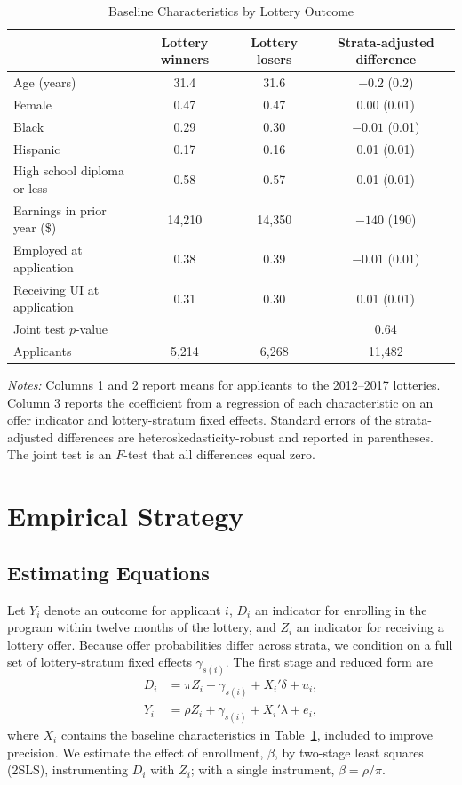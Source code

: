 \documentclass[12pt]{article}
\begin{document}
\begin{table}[htbp]
\centering
\small
\caption{Baseline Characteristics by Lottery Outcome}
\label{tab:balance}
\begin{tabular}{lccc}
\toprule
 & Lottery winners & Lottery losers & Strata-adjusted difference \\
\midrule
Age (years) & 31.4 & 31.6 & $-0.2$ (0.2) \\
Female & 0.47 & 0.47 & 0.00 (0.01) \\
Black & 0.29 & 0.30 & $-0.01$ (0.01) \\
Hispanic & 0.17 & 0.16 & 0.01 (0.01) \\
High school diploma or less & 0.58 & 0.57 & 0.01 (0.01) \\
Earnings in prior year (\$) & 14,210 & 14,350 & $-140$ (190) \\
Employed at application & 0.38 & 0.39 & $-0.01$ (0.01) \\
Receiving UI at application & 0.31 & 0.30 & 0.01 (0.01) \\
\midrule
Joint test $p$-value & & & 0.64 \\
Applicants & 5,214 & 6,268 & 11,482 \\
\bottomrule
\end{tabular}
\par\medskip
\begin{minipage}{0.92\linewidth}
\footnotesize \textit{Notes:} Columns 1 and 2 report means for applicants to the 2012--2017 lotteries. Column 3 reports the coefficient from a regression of each characteristic on an offer indicator and lottery-stratum fixed effects. Standard errors of the strata-adjusted differences are heteroskedasticity-robust and reported in parentheses. The joint test is an $F$-test that all differences equal zero.
\end{minipage}
\end{table}

\section{Empirical Strategy}\label{sec:strategy}

\subsection{Estimating Equations}

Let $Y_i$ denote an outcome for applicant $i$, $D_i$ an indicator for enrolling in the program within twelve months of the lottery, and $Z_i$ an indicator for receiving a lottery offer. Because offer probabilities differ across strata, we condition on a full set of lottery-stratum fixed effects $\gamma_{s(i)}$. The first stage and reduced form are
\begin{align}
D_i &= \pi Z_i + \gamma_{s(i)} + X_i'\delta + u_i, \\
Y_i &= \rho Z_i + \gamma_{s(i)} + X_i'\lambda + e_i,
\end{align}
where $X_i$ contains the baseline characteristics in Table~\ref{tab:balance}, included to improve precision. We estimate the effect of enrollment, $\beta$, by two-stage least squares (2SLS), instrumenting $D_i$ with $Z_i$; with a single instrument, $\beta = \rho/\pi$.
\end{document}
